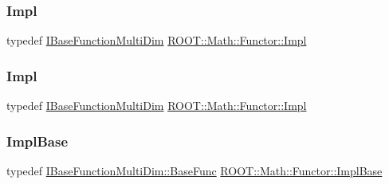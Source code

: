\mbox{\label{classROOT_1_1Math_1_1Functor_aef374d72e63fb0fea13a8cc3d4f2091b}} 
\subsubsection{\texorpdfstring{Impl}{Impl}\hspace{0.1cm}{\footnotesize\ttfamily [2/3]}}
{\footnotesize\ttfamily typedef \mbox{\hyperlink{classROOT_1_1Math_1_1IBaseFunctionMultiDim}{I\+Base\+Function\+Multi\+Dim}} \mbox{\hyperlink{classROOT_1_1Math_1_1Functor_aef374d72e63fb0fea13a8cc3d4f2091b}{R\+O\+O\+T\+::\+Math\+::\+Functor\+::\+Impl}}}

\mbox{\label{classROOT_1_1Math_1_1Functor_aef374d72e63fb0fea13a8cc3d4f2091b}} 
\subsubsection{\texorpdfstring{Impl}{Impl}\hspace{0.1cm}{\footnotesize\ttfamily [3/3]}}
{\footnotesize\ttfamily typedef \mbox{\hyperlink{classROOT_1_1Math_1_1IBaseFunctionMultiDim}{I\+Base\+Function\+Multi\+Dim}} \mbox{\hyperlink{classROOT_1_1Math_1_1Functor_aef374d72e63fb0fea13a8cc3d4f2091b}{R\+O\+O\+T\+::\+Math\+::\+Functor\+::\+Impl}}}

\mbox{\label{classROOT_1_1Math_1_1Functor_acc5dacb213f26296122e95138f5153b3}} 
\subsubsection{\texorpdfstring{ImplBase}{ImplBase}\hspace{0.1cm}{\footnotesize\ttfamily [1/3]}}
{\footnotesize\ttfamily typedef \mbox{\hyperlink{classROOT_1_1Math_1_1IBaseFunctionMultiDim_a44c87c3e8c23d140cc3bf067d6480070}{I\+Base\+Function\+Multi\+Dim\+::\+Base\+Func}} \mbox{\hyperlink{classROOT_1_1Math_1_1Functor_acc5dacb213f26296122e95138f5153b3}{R\+O\+O\+T\+::\+Math\+::\+Functor\+::\+Impl\+Base}}}

